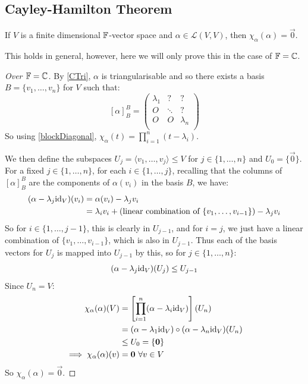 \documentclass[../main.tex]{subfiles}
\begin{document}
\subsection{Cayley-Hamilton Theorem}
\begin{theorem}
  If $V$ is a finite dimensional $\mathbb{F}$-vector space and $\alpha \in \mathcal{L}(V, V)$, then $\chi_{\alpha}(\alpha) = \vec{0}$. \label{CHT}
\end{theorem}
This holds in general, however, here we will only prove this in the case of $\mathbb{F} = \mathbb{C}$.
\begin{proof}[Over $\mathbb{F} =\mathbb{C}$]
  By \cref{CTri}, $\alpha$ is triangularisable and so there exists a basis $B = \{v_1, \ldots, v_n\}$ for $V$ such that:
  \[
    [\alpha]^{B}_{B} = \begin{pmatrix*}
                    \lambda_1 & ? & ? \\
                    O & \ddots & ? \\
                    O & O & \lambda_n \\
                    \end{pmatrix*}
  \]
  So using \cref{blockDiagonal}, $\chi_{\alpha}(t) = \prod_{i = 1}^{n} (t - \lambda_i)$.

  We then define the subspaces $U_j = \langle v_1, \ldots, v_j \rangle \leq V$ for $j \in \{1, \ldots, n\}$ and $U_{0} = \{\vec{0}\}$.
  For a fixed $j \in \{1, \ldots, n\}$, for each $i \in \{1, \ldots, j\}$, recalling that the columns of $[\alpha]^{B}_{B}$ are the components of $\alpha(v_i)$ in the basis $B$, we have:
  \begin{align*}
    (\alpha - \lambda_j\mathrm{id}_V)(v_i) &= \alpha(v_i) - \lambda_j v_i \\
                                   &= \lambda_i v_i + (\text{linear combination of $\{v_1, \ldots, v_{i - 1}\}$}) - \lambda_j v_i
  \end{align*}
  So for $i \in \{1, \ldots, j - 1\}$, this is clearly in $U_{j - 1}$, and for $i = j$, we just have a linear combination of $\{v_1, \ldots, v_{i - 1}\}$, which is also in $U_{j - 1}$.
  Thus each of the basis vectors for $U_j$ is mapped into $U_{j - 1}$ by this, so for $j \in \{1, \ldots, n\}$:
  \[
    (\alpha - \lambda_j \mathrm{id}_V)(U_j) \leq U_{j - 1}
  \]
  Since $U_n = V$:
  \begin{align*}
    \chi_{\alpha}(\alpha)(V) &= \left[\prod_{i = 1}^{n} (\alpha - \lambda_i \mathrm{id}_V)\right](U_n) \\
                             &= (\alpha - \lambda_1 \mathrm{id}_V) \circ (\alpha - \lambda_n \mathrm{id}_V) (U_n) \\
                             &\leq U_0 = \{\mathbf{\bm{0}}\} \\
    \implies \chi_{\alpha}(\alpha)(v) &= \mathbf{\bm{0}}\ \forall v \in V
  \end{align*}
  So $\chi_{\alpha}(\alpha) = \vec{0}$.
\end{proof}
\end{document}
